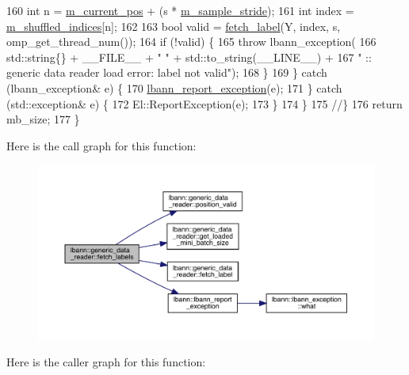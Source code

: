 \begin{DoxyCode}
160         \textcolor{keywordtype}{int} n = \hyperlink{classlbann_1_1generic__data__reader_a2facf4e410099ac8c1fa586e797ec2e0}{m\_current\_pos} + (s * \hyperlink{classlbann_1_1generic__data__reader_a58461c39de7e17eafc5b98aec99cbb9b}{m\_sample\_stride});
161         \textcolor{keywordtype}{int} index = \hyperlink{classlbann_1_1generic__data__reader_aaab6aeff67ffff1c689336851fec2c57}{m\_shuffled\_indices}[n];
162 
163         \textcolor{keywordtype}{bool} valid = \hyperlink{classlbann_1_1generic__data__reader_a03627408c1d1aa28691d31232fe1dce5}{fetch\_label}(Y, index, s, omp\_get\_thread\_num());
164         \textcolor{keywordflow}{if} (!valid) \{
165           \textcolor{keywordflow}{throw} lbann\_exception(
166             std::string\{\} + \_\_FILE\_\_ + \textcolor{stringliteral}{" "} + std::to\_string(\_\_LINE\_\_) +
167             \textcolor{stringliteral}{" :: generic data reader load error: label not valid"});
168         \}
169       \} \textcolor{keywordflow}{catch} (lbann\_exception& e) \{
170         \hyperlink{namespacelbann_aedccb3bf2d674ccb5573ab9960720731}{lbann\_report\_exception}(e);
171       \} \textcolor{keywordflow}{catch} (std::exception& e) \{
172         El::ReportException(e);
173       \}
174     \}
175   \textcolor{comment}{//\}}
176   \textcolor{keywordflow}{return} mb\_size;
177 \}
\end{DoxyCode}
Here is the call graph for this function\+:\nopagebreak
\begin{figure}[H]
\begin{center}
\leavevmode
\includegraphics[width=350pt]{classlbann_1_1generic__data__reader_a7e624f92e38b0ee4224a6afaaf2acbdb_cgraph}
\end{center}
\end{figure}
Here is the caller graph for this function\+:\nopagebreak
